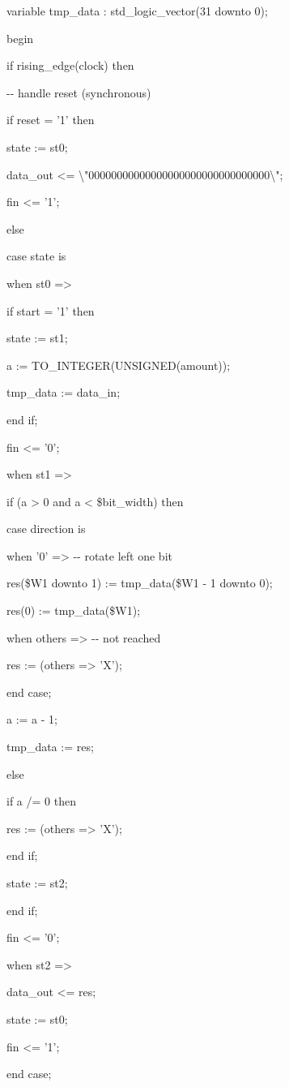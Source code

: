 \documentclass[
]{article}
\begin{document}
variable tmp\_data : std\_logic\_vector(31 downto 0);

begin

if rising\_edge(clock) then

-\/- handle reset (synchronous)

if reset = '1' then

state := st0;

data\_out \textless=
\textbackslash"00000000000000000000000000000000\textbackslash";

fin \textless= '1';

else

case state is

when st0 =\textgreater{}

if start = '1' then

state := st1;

a := TO\_INTEGER(UNSIGNED(amount));

tmp\_data := data\_in;

end if;

fin \textless= '0';

when st1 =\textgreater{}

if (a \textgreater{} 0 and a \textless{} \$bit\_width) then

case direction is

when '0' =\textgreater{} -\/- rotate left one bit

res(\$W1 downto 1) := tmp\_data(\$W1 - 1 downto 0);

res(0) := tmp\_data(\$W1);

when others =\textgreater{} -\/- not reached

res := (others =\textgreater{} 'X');

end case;

a := a - 1;

tmp\_data := res;

else

if a /= 0 then

res := (others =\textgreater{} 'X');

end if;

state := st2;

end if;

fin \textless= '0';

when st2 =\textgreater{}

data\_out \textless= res;

state := st0;

fin \textless= '1';

end case;
\end{document}
